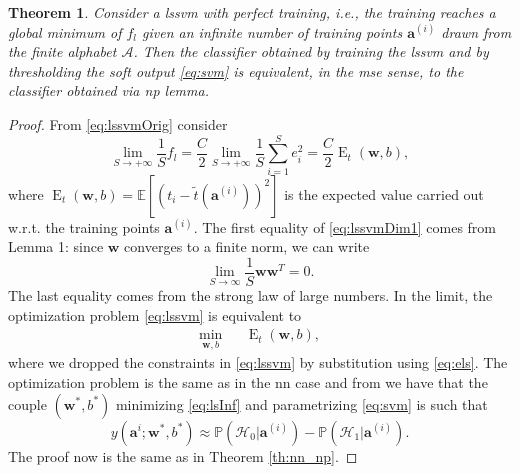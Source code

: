 \documentclass[draftcls,onecolumn,12pt]{IEEEtran}
\newcommand{\ie}{i.e., }
\newcommand{\wrt}{w.r.t. }
\newcommand{\Exp}[1]{\mathbb{E}\left[#1\right]}
\DeclareMathOperator{\E}{E}
\newtheorem{theorem}{Theorem}
\begin{document}
\begin{theorem}
	\label{th:lsnp}
	Consider a \ac{lssvm} with perfect training, \ie the training reaches a global minimum of $f_l$ given an infinite number of training points $\bm{a}^{(i)}$ drawn from the finite alphabet $\mathcal A$. Then the classifier obtained by training the \ac{lssvm} and by thresholding the soft output \eqref{eq:svm} is equivalent, in the \ac{mse} sense, to the classifier obtained via \ac{np} lemma.
\end{theorem}
\begin{proof}
	From \eqref{eq:lssvmOrig} consider
	\begin{equation}
	\label{eq:lssvmDim1}
	\lim_{S \to +\infty} \frac{1}{S} f_l =\frac{C}{2} \lim_{S \to +\infty}\frac{1}{S}  \sum_{i=1}^S e^2_i	=\frac{C}{2}\E_t(\bm{w},b),
	\end{equation}
	where $\E_t(\bm{w},b) = \Exp{\left(t_i - \tilde{t}(\bm{a}^{(i)})\right)^2} $ is the expected value carried out \wrt the training points $\bm{a}^{(i)}$. 
	The first equality of \eqref{eq:lssvmDim1} comes from Lemma 1: since $\bm{w}$ converges to a finite norm, we can write
	\begin{equation}
	\lim_{S\to \infty} \frac{1}{S} \bm{w} \bm{w}^T 	= 0.
	\end{equation} 
	The last equality comes from the strong law of large numbers. In the limit, the optimization problem \eqref{eq:lssvm} is equivalent to
	\begin{equation}
	\label{eq:lsInf}
	\begin{aligned}
	& \underset{\bm{w},b}{\text{min}} & &  \E_t(\bm{w},b), & 
	\end{aligned}	
	\end{equation}
	where we dropped the constraints in \eqref{eq:lssvm} by substitution using \eqref{eq:els}. The optimization problem is the same as in the \ac{nn} case and from \cite{Ruck-90} we have that the couple $(\bm{w}^*,b^*)$ minimizing \eqref{eq:lsInf} and parametrizing \eqref{eq:svm} is such that
	\begin{equation}
	y(\bm{a}^i;\bm{w}^*,b^*)  \approx \mathbb{P}(\mathcal{H}_0|\bm{a}^{(i)}) - \mathbb{P}(\mathcal{H}_1|\bm{a}^{(i)}).
	\end{equation}
	The proof now is the same as in Theorem \ref{th:nn_np}.
\end{proof}
\end{document}

